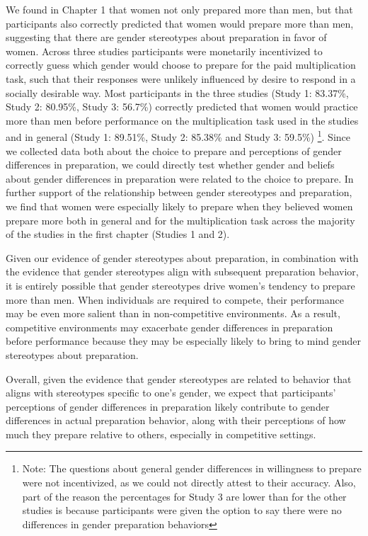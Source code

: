 \documentclass[a4paper, nobind]{templates/ociamthesis}
\begin{document}
We found in Chapter 1 that women not only prepared more than men, but that participants also correctly predicted that women would prepare more than men, suggesting that there are gender stereotypes about preparation in favor of women. Across three studies participants were monetarily incentivized to correctly guess which gender would choose to prepare for the paid multiplication task, such that their responses were unlikely influenced by desire to respond in a socially desirable way. Most participants in the three studies (Study 1: 83.37\%, Study 2: 80.95\%, Study 3: 56.7\%) correctly predicted that women would practice more than men before performance on the multiplication task used in the studies and in general (Study 1: 89.51\%, Study 2: 85.38\% and Study 3: 59.5\%) \footnote{Note: The questions about general gender differences in willingness to prepare were not incentivized, as we could not directly attest to their accuracy. Also, part of the reason the percentages for Study 3 are lower than for the other studies is because participants were given the option to say there were no differences in gender preparation behaviors}. Since we collected data both about the choice to prepare and perceptions of gender differences in preparation, we could directly test whether gender and beliefs about gender differences in preparation were related to the choice to prepare. In further support of the relationship between gender stereotypes and preparation, we find that women were especially likely to prepare when they believed women prepare more both in general and for the multiplication task across the majority of the studies in the first chapter (Studies 1 and 2).

Given our evidence of gender stereotypes about preparation, in combination with the evidence that gender stereotypes align with subsequent preparation behavior, it is entirely possible that gender stereotypes drive women's tendency to prepare more than men. When individuals are required to compete, their performance may be even more salient than in non-competitive environments. As a result, competitive environments may exacerbate gender differences in preparation before performance because they may be especially likely to bring to mind gender stereotypes about preparation.

Overall, given the evidence that gender stereotypes are related to behavior that aligns with stereotypes specific to one's gender, we expect that participants' perceptions of gender differences in preparation likely contribute to gender differences in actual preparation behavior, along with their perceptions of how much they prepare relative to others, especially in competitive settings.
\end{document}
